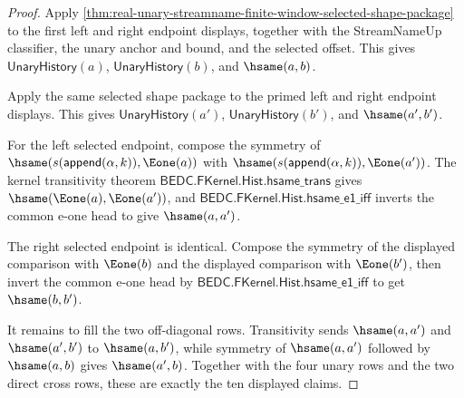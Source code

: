 \begin{proof}
Apply
\autoref{thm:real-unary-streamname-finite-window-selected-shape-package} to the
first left and right endpoint displays, together with the StreamNameUp classifier,
the unary anchor and bound, and the selected offset. This gives
$\mathsf{UnaryHistory}(a)$, $\mathsf{UnaryHistory}(b)$, and $\hsame(a,b)$.

Apply the same selected shape package to the primed left and right endpoint
displays. This gives $\mathsf{UnaryHistory}(a')$, $\mathsf{UnaryHistory}(b')$,
and $\hsame(a',b')$.

For the left selected endpoint, compose the symmetry of
$\hsame(s(\mathsf{append}(\alpha,k)),\Eone(a))$ with
$\hsame(s(\mathsf{append}(\alpha,k)),\Eone(a'))$. The kernel transitivity theorem
$\mathsf{BEDC.FKernel.Hist.hsame\_trans}$ gives
$\hsame(\Eone(a),\Eone(a'))$, and
$\mathsf{BEDC.FKernel.Hist.hsame\_e1\_iff}$ inverts the common e-one head to give
$\hsame(a,a')$.

The right selected endpoint is identical. Compose the symmetry of the displayed
comparison with $\Eone(b)$ and the displayed comparison with $\Eone(b')$, then
invert the common e-one head by
$\mathsf{BEDC.FKernel.Hist.hsame\_e1\_iff}$ to get $\hsame(b,b')$.

It remains to fill the two off-diagonal rows. Transitivity sends
$\hsame(a,a')$ and $\hsame(a',b')$ to $\hsame(a,b')$, while symmetry of
$\hsame(a,a')$ followed by $\hsame(a,b)$ gives $\hsame(a',b)$. Together with the
four unary rows and the two direct cross rows, these are exactly the ten displayed
claims.
\end{proof}

